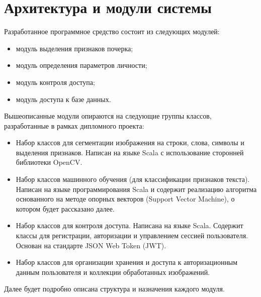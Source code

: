 \section{Архитектура и модули системы}

Разработанное программное средство состоит из следующих модулей:
\begin{itemize}
    \item модуль выделения признаков почерка;
    \item модуль определения параметров личности;
    \item модуль контроля доступа;
    \item модуль доступа к базе данных.
\end{itemize}

Вышеописанные модули опираются на следующие группы классов, разработанные в рамках дипломного проекта:
\begin{itemize}
    \item Набор классов для сегментации изображения на строки, слова, символы и выделения признаков. Написан на языке Scala с использование сторонней библиотеки OpenCV.
    \item Набор классов машинного обучения (для классификации признаков текста). Написан на языке программирования Scala и содержит реализацию алгоритма основанного на методе опорных векторов (Support Vector Machine), о котором будет рассказано далее.
    \item Набор классов для контроля доступа. Написана на языке Scala. Содержит классы для регистрации, авторизации и управлением сессией пользователя. Основан на стандарте JSON Web Token (JWT).
    \item Набор классов для организации хранения и доступа к авторизационным данным пользователя и коллекции обработанных изображений.
\end{itemize}

Далее будет подробно описана структура и назначения каждого модуля.


